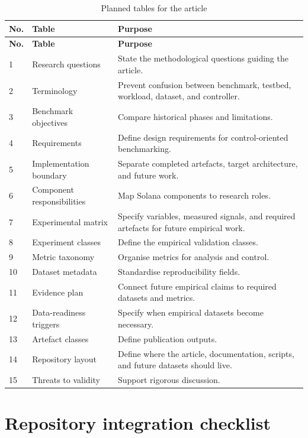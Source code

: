 \documentclass[11pt,a4paper]{article}
\begin{document}
\begin{longtable}{L{1.2cm}L{4.0cm}L{9.0cm}}
\caption{Planned tables for the article}\label{tab:table-list}\\
\toprule
\textbf{No.} & \textbf{Table} & \textbf{Purpose} \\
\midrule
\endfirsthead
\toprule
\textbf{No.} & \textbf{Table} & \textbf{Purpose} \\
\midrule
{} & Research questions & State the methodological questions guiding the article. \\
2 & Terminology & Prevent confusion between benchmark, testbed, workload, dataset, and controller. \\
3 & Benchmark objectives & Compare historical phases and limitations. \\
4 & Requirements & Define design requirements for control-oriented benchmarking. \\
5 & Implementation boundary & Separate completed artefacts, target architecture, and future work. \\
6 & Component responsibilities & Map Solana components to research roles. \\
7 & Experimental matrix & Specify variables, measured signals, and required artefacts for future empirical work. \\
8 & Experiment classes & Define the empirical validation classes. \\
9 & Metric taxonomy & Organise metrics for analysis and control. \\
10 & Dataset metadata & Standardise reproducibility fields. \\
11 & Evidence plan & Connect future empirical claims to required datasets and metrics. \\
12 & Data-readiness triggers & Specify when empirical datasets become necessary. \\
13 & Artefact classes & Define publication outputs. \\
14 & Repository layout & Define where the article, documentation, scripts, and future datasets should live. \\
15 & Threats to validity & Support rigorous discussion. \\
\bottomrule
\end{longtable}


\section{Repository integration checklist}
\label{app:repository-integration-checklist}
\end{document}
